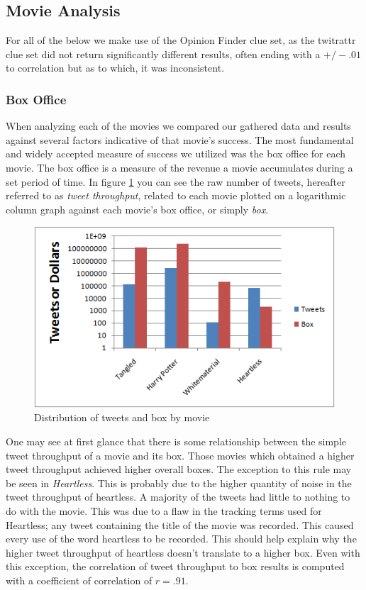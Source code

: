 \documentclass[11pt]{article}
\begin{document}
\subsection{Movie Analysis}
For all of the below we make use of the Opinion Finder clue set, as the twitrattr clue set did not return significantly different results, often ending with a $+/-.01$ to correlation but as to which, it was inconsistent.
\subsubsection{Box Office}
When analyzing each of the movies we compared our gathered data and results against several factors indicative of that movie's success. The most fundamental and widely accepted measure of success we utilized was the box office for each movie. The box office is a measure of the revenue a movie accumulates during a set period of time. In figure \ref{fig:moviebox} you can see the raw number of tweets, hereafter referred to as \textit{tweet throughput}, related to each movie plotted on a logarithmic column graph against each movie's box office, or simply \textit{box}. 
\begin{figure}[ht!]\label{fig:moviebox}
\centering
\includegraphics[scale=.60]{img/moviebox.png} 
\caption{Distribution of tweets and box by movie}
\end{figure}
One may see at first glance that there is some relationship between the simple tweet throughput of a movie and its box. Those movies which obtained a higher tweet throughput achieved higher overall boxes. The exception to this rule may be seen in \textit{Heartless}. This is probably due to the higher quantity of noise in the tweet throughput of heartless. A majority of the tweets had little to nothing to do with the movie. This was due to a flaw in the tracking terms used for Heartless; any tweet containing the title of the movie was recorded. This caused every use of the word heartless to be recorded. This should help explain why the higher tweet throughput of heartless doesn't translate to a higher box. Even with this exception, the correlation of tweet throughput to box results is computed with a coefficient of correlation of $r=.91$. 
\end{document}

